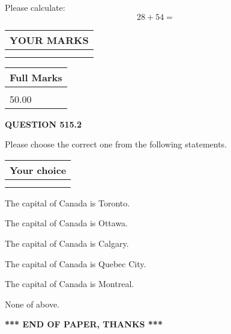 \documentclass[12pt]{article}
\begin{document}
  
 
Please calculate:
\begin{equation}
28 +  %
54 = \nonumber
\end{equation}
 

 

 
  
\vspace{0.2in}
  
\noindent\begin{tabular}{|l|}
\hline
 YOUR MARKS  \\
\hline
 \\ 
 \\ 
\hline
\end{tabular}
\hspace{0.05in} \begin{tabular}{|l|}
\hline
 Full Marks  \\
\hline
 \\ 
50.00 \\
\hline
\end{tabular}
{\textbf{\Large{QUESTION
515.2 
}}}
  
  
Please choose the correct one from the following statements.
  
  
\noindent\hspace{3.0in} \begin{tabular}{|l|}
\hline
Your choice \\
\hline
 \\ 
 \\ 
\hline
\end{tabular}
  
  
 
 
The capital of Canada is Toronto.
 
 
The capital of Canada is Ottawa.
 
 
The capital of Canada is Calgary.
 
 
The capital of Canada is Quebec City.
 
 
The capital of Canada is Montreal.
 
 
 None of above.
 
 
   
   
 \vspace{0.2in}
 
   
   
   
   
\vspace{1.0in} 
{\textbf{\large{ *** END OF PAPER, THANKS *** }}} 
   
\end{document}
